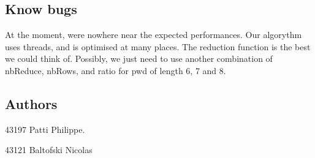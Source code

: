 \subsection*{Know bugs}

At the moment, we\textquotesingle{}re nowhere near the expected performances. Our algorythm uses threads, and is optimised at many places. The reduction function is the best we could think of. Possibly, we just need to use another combination of nb\+Reduce, nb\+Rows, and ratio for pwd of length 6, 7 and 8.

\subsection*{Authors}

43197 Patti Philippe.

43121 Baltofski Nicolas 